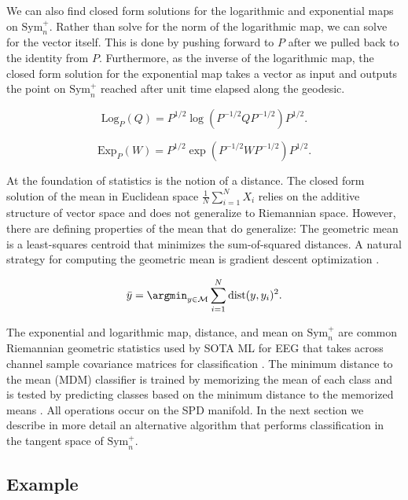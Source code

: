 \documentclass[../../../main.tex]{subfiles}
\begin{document}
We can also find closed form solutions for the logarithmic and exponential maps on $\text{Sym}_n^+$. Rather than solve for the norm of the logarithmic map, we can solve for the vector itself. This is done by pushing forward to $P$ after we pulled back to the identity from $P$. Furthermore, as the inverse of the logarithmic map, the closed form solution for the exponential map takes a vector as input and outputs the point on $\text{Sym}_n^+$ reached after unit time elapsed along the geodesic.

\begin{equation}
\text{Log}_P(Q) = P^{1/2}\log(P^{-1/2}QP^{-1/2})P^{1/2}.
\end{equation}

\begin{equation}
\text{Exp}_P(W) = P^{1/2}\exp(P^{-1/2}WP^{-1/2})P^{1/2}.
\end{equation}

At the foundation of statistics is the notion of a distance. The closed form solution of the mean in Euclidean space $\frac{1}{N}\sum_{i=1}^N X_i$ relies on the additive structure of vector space and does not generalize to Riemannian space. However, there are defining properties of the mean that do generalize: The geometric mean is a least-squares centroid that minimizes the sum-of-squared distances. A natural strategy for computing the geometric mean is gradient descent optimization \autocite{Fletcher2020}.

\begin{equation}
\bar{y} = \argmin_{y\in\mathcal{M}}\sum_{i=1}^N \text{dist}(y,y_i)^2.
\end{equation}

The exponential and logarithmic map, distance, and mean on $\text{Sym}_n^+$ are common Riemannian geometric statistics used by SOTA ML for EEG that takes across channel sample covariance matrices for classification \autocite{Barachant2012, Chevallier2018}. The minimum distance to the mean (MDM) classifier is trained by memorizing the mean of each class and is tested by predicting classes based on the minimum distance to the memorized means \autocite{Barachant2012}. All operations occur on the SPD manifold. In the next section we describe in more detail an alternative algorithm that performs classification in the tangent space of $\text{Sym}_n^+$.

\subsection{Example}
\end{document}
